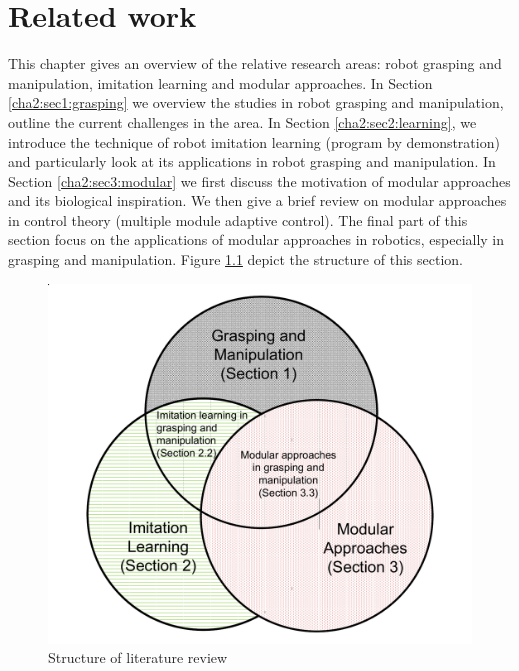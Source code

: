 \chapter{Related work}
\label{cha2}

This chapter gives an overview of the relative research areas: robot grasping and manipulation, imitation learning and modular approaches. In Section \ref{cha2:sec1:grasping} we overview the studies in robot grasping and manipulation, outline the current challenges in the area. In Section \ref{cha2:sec2:learning}, we introduce the technique of robot imitation learning (program by demonstration) and particularly look at its applications in robot grasping and manipulation. In Section \ref{cha2:sec3:modular} we first discuss the motivation of modular approaches and its biological inspiration. We then give a brief review on modular approaches in control theory (multiple module adaptive control). The final part of this section focus on the applications of modular approaches in robotics, especially in grasping and manipulation. Figure \ref{fig:litreview} depict the structure of this section.

\begin{figure}
\centering
  \includegraphics[width=12cm]{./fig_cha2/litreview.pdf}
  \caption{Structure of literature review}
  \label{fig:litreview}
\end{figure}





%
%
%





